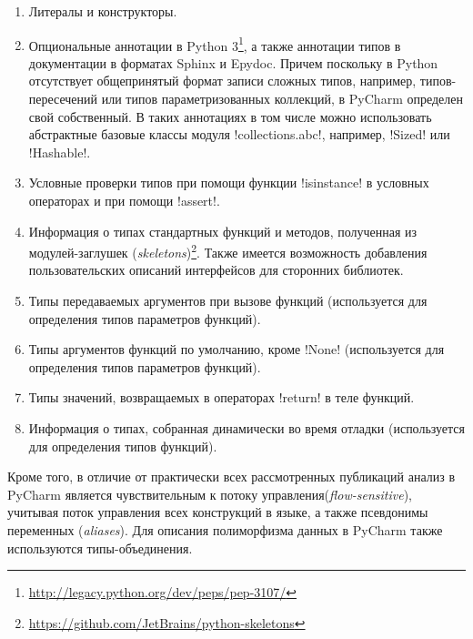 \begin{enumerate}
    \item Литералы и конструкторы.

    \item Опциональные аннотации в Python
      3\footnote{\url{http://legacy.python.org/dev/peps/pep-3107/}}, а также
      аннотации типов в документации в форматах Sphinx и Epydoc. Причем поскольку в
      Python отсутствует общепринятый формат записи сложных типов, например,
      типов-пересечений или типов параметризованных коллекций, в PyCharm
      определен свой собственный.
      В таких аннотациях в том числе можно использовать абстрактные базовые
      классы модуля !collections.abc!, например, !Sized! или !Hashable!.

    \item Условные проверки типов при помощи функции !isinstance! в условных
      операторах и при помощи !assert!.

    \item Информация о типах стандартных функций и методов, полученная из
        модулей-заглушек
        (\emph{skeletons})\footnote{\url{https://github.com/JetBrains/python-skeletons}}.
        Также имеется возможность добавления пользовательских описаний
        интерфейсов для сторонних библиотек.

    \item Типы передаваемых аргументов при вызове функций (используется для
      определения типов параметров функций).

    \item Типы аргументов функций по умолчанию, кроме !None! (используется для
      определения типов параметров функций). 

    \item Типы значений, возвращаемых в операторах !return! в теле функций. 

    \item Информация о типах, собранная динамически во время отладки 
      (используется для определения типов функций).

\end{enumerate}

Кроме того, в отличие от практически всех рассмотренных публикаций анализ в
PyCharm является чувствительным к потоку управления(\emph{flow-sensitive}),
учитывая поток управления всех конструкций в языке, а также псевдонимы переменных
(\emph{aliases}). Для описания полиморфизма данных в PyCharm также используются
типы-объединения. 

